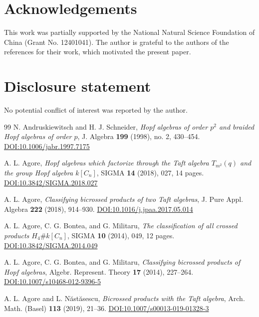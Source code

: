 \documentclass[twoside,11pt]{amsart}
\begin{document}
	
	\section*{Acknowledgements}
	
	This work was partially supported by the National Natural Science Foundation
	of China (Grant No. 12401041). The author is grateful to the authors of the references for their work, which motivated the present paper.
	
	
	\section*{Disclosure statement}
	No potential conflict of interest was reported by the author.
	
	\begin{thebibliography}{99}
		N. Andruskiewitsch and H. J. Schneider,
		\emph{Hopf algebras of order $p^2$ and braided Hopf algebras of order $p$},
		J. Algebra \textbf{199} (1998), no. 2, 430--454.
		\href{https://doi.org/10.1006/jabr.1997.7175}{DOI:10.1006/jabr.1997.7175}
		
		
		
		A. L. Agore,
		\emph{Hopf algebras which factorize through the Taft algebra
			$T_{m^2}(q)$ and the group Hopf algebra $k[C_n]$},
		SIGMA \textbf{14} (2018), 027, 14 pages.
		\href{https://doi.org/10.3842/SIGMA.2018.027}{DOI:10.3842/SIGMA.2018.027}
		
		A. L. Agore,
		\emph{Classifying bicrossed products of two Taft algebras},
		J. Pure Appl. Algebra \textbf{222} (2018), 914--930.
		\href{https://doi.org/10.1016/j.jpaa.2017.05.014}{DOI:10.1016/j.jpaa.2017.05.014}
		
		A. L. Agore, C. G. Bontea, and G. Militaru,
		\emph{The classification of all crossed products $H_4\# k[C_n]$},
		SIGMA \textbf{10} (2014), 049, 12 pages.
		\href{https://doi.org/10.3842/SIGMA.2014.049}{DOI:10.3842/SIGMA.2014.049}
		
		A. L. Agore, C. G. Bontea, and G. Militaru,
		\emph{Classifying bicrossed products of Hopf algebras},
		Algebr. Represent. Theory \textbf{17} (2014), 227--264.
		\href{https://doi.org/10.1007/s10468-012-9396-5}{DOI:10.1007/s10468-012-9396-5}
		
		
		A. L. Agore and L. N\u{a}st\u{a}sescu,
		\emph{Bicrossed products with the Taft algebra},
		Arch. Math. (Basel) \textbf{113} (2019), 21--36.
		\href{https://doi.org/10.1007/s00013-019-01328-3}{DOI:10.1007/s00013-019-01328-3}
		

\end{thebibliography}
\end{document}
